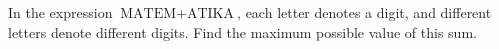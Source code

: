 In the expression $\text{MATEM}+\text{ATIKA}$, each letter denotes a digit, and different letters denote different digits. Find the maximum possible value of this sum.
